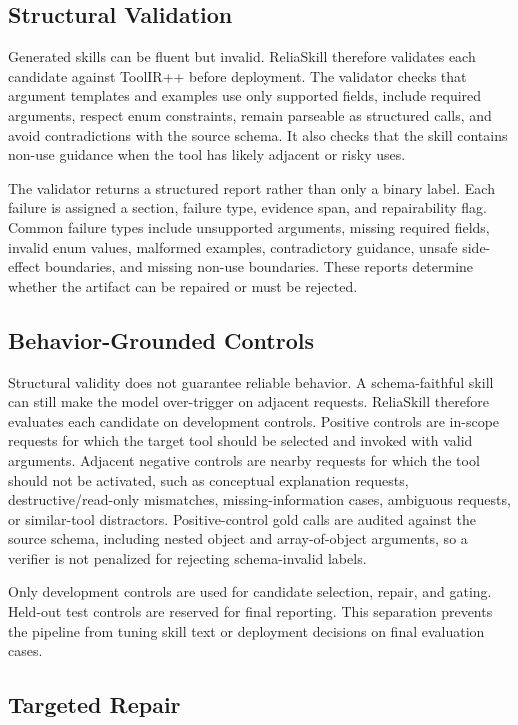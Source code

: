\documentclass[11pt]{article}
\newcommand{\method}{ReliaSkill}
\begin{document}
\subsection{Structural Validation}

Generated skills can be fluent but invalid. \method{} therefore validates each candidate against ToolIR++ before deployment. The validator checks that argument templates and examples use only supported fields, include required arguments, respect enum constraints, remain parseable as structured calls, and avoid contradictions with the source schema. It also checks that the skill contains non-use guidance when the tool has likely adjacent or risky uses.

The validator returns a structured report rather than only a binary label. Each failure is assigned a section, failure type, evidence span, and repairability flag. Common failure types include unsupported arguments, missing required fields, invalid enum values, malformed examples, contradictory guidance, unsafe side-effect boundaries, and missing non-use boundaries. These reports determine whether the artifact can be repaired or must be rejected.

\subsection{Behavior-Grounded Controls}

Structural validity does not guarantee reliable behavior. A schema-faithful skill can still make the model over-trigger on adjacent requests. \method{} therefore evaluates each candidate on development controls. Positive controls are in-scope requests for which the target tool should be selected and invoked with valid arguments. Adjacent negative controls are nearby requests for which the tool should not be activated, such as conceptual explanation requests, destructive/read-only mismatches, missing-information cases, ambiguous requests, or similar-tool distractors. Positive-control gold calls are audited against the source schema, including nested object and array-of-object arguments, so a verifier is not penalized for rejecting schema-invalid labels.

Only development controls are used for candidate selection, repair, and gating. Held-out test controls are reserved for final reporting. This separation prevents the pipeline from tuning skill text or deployment decisions on final evaluation cases.

\subsection{Targeted Repair}
\end{document}
